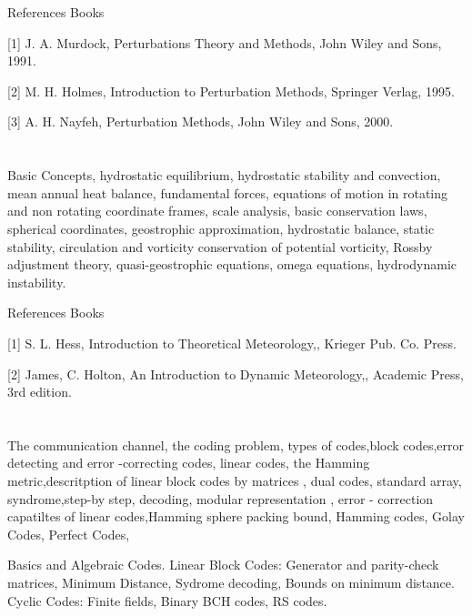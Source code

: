  

References Books  

[1] J. A. Murdock, Perturbations Theory and Methods, John Wiley and Sons, 1991.  

[2] M. H. Holmes, Introduction to Perturbation Methods, Springer Verlag, 1995.  

[3] A. H. Nayfeh, Perturbation Methods, John Wiley and Sons, 2000. 

 
\section{\dsccourseinfo}

 

Basic Concepts, hydrostatic equilibrium, hydrostatic stability and convection, mean annual heat balance, fundamental forces, equations of motion in rotating and non rotating coordinate frames, scale analysis, basic conservation laws, spherical coordinates, geostrophic approximation, hydrostatic balance, static stability, circulation and vorticity conservation of potential vorticity, Rossby adjustment theory, quasi-geostrophic equations, omega equations, hydrodynamic instability.  

 

References Books  

[1]  S. L. Hess, Introduction to Theoretical Meteorology,, Krieger Pub. Co. Press. 

[2] James, C. Holton, An Introduction to Dynamic Meteorology,, Academic Press, 3rd edition. 

 

 
\section{\dsccourseinfo}

 

The communication channel, the coding problem, types of codes,block codes,error detecting and error -correcting codes, linear codes, the Hamming metric,descritption of linear block codes by matrices , dual codes, standard array, syndrome,step-by step, decoding, modular representation , error - correction capatiltes of linear codes,Hamming sphere packing bound, Hamming codes, Golay Codes, Perfect Codes,  

Basics and Algebraic Codes. Linear Block Codes: Generator and parity-check matrices, Minimum Distance, Sydrome decoding, Bounds on minimum distance. Cyclic Codes: Finite fields, Binary BCH codes, RS codes. 

